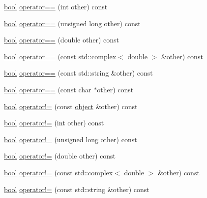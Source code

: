 \begin{DoxyCompactItemize}
\item 
\hyperlink{compiler_8h_abb452686968e48b67397da5f97445f5b}{bool} \hyperlink{classpy_1_1object_a43cecaad392dac405e8fbb5b777f9938}{operator==} (int other) const 
\item 
\hyperlink{compiler_8h_abb452686968e48b67397da5f97445f5b}{bool} \hyperlink{classpy_1_1object_aa6c7305145b8b872b36fb27cf8397a53}{operator==} (unsigned long other) const 
\item 
\hyperlink{compiler_8h_abb452686968e48b67397da5f97445f5b}{bool} \hyperlink{classpy_1_1object_a0722a770c6c637faceb3712f6ebbe2d5}{operator==} (double other) const 
\item 
\hyperlink{compiler_8h_abb452686968e48b67397da5f97445f5b}{bool} \hyperlink{classpy_1_1object_af08db740fdcaeb183d13c91303adff3d}{operator==} (const std\+::complex$<$ double $>$ \&other) const 
\item 
\hyperlink{compiler_8h_abb452686968e48b67397da5f97445f5b}{bool} \hyperlink{classpy_1_1object_af367909d01e241b06262c3dc494a192f}{operator==} (const std\+::string \&other) const 
\item 
\hyperlink{compiler_8h_abb452686968e48b67397da5f97445f5b}{bool} \hyperlink{classpy_1_1object_a72f844fcad6f46820f20ff14ce8ca26d}{operator==} (const char $\ast$other) const 
\item 
\hyperlink{compiler_8h_abb452686968e48b67397da5f97445f5b}{bool} \hyperlink{classpy_1_1object_a92b7e3e69238050e97fca69ef7c80425}{operator!=} (const \hyperlink{classpy_1_1object}{object} \&other) const 
\item 
\hyperlink{compiler_8h_abb452686968e48b67397da5f97445f5b}{bool} \hyperlink{classpy_1_1object_a402ac86190da45d937239044181ed126}{operator!=} (int other) const 
\item 
\hyperlink{compiler_8h_abb452686968e48b67397da5f97445f5b}{bool} \hyperlink{classpy_1_1object_a0b010b582ef6633267ba1f51cee50526}{operator!=} (unsigned long other) const 
\item 
\hyperlink{compiler_8h_abb452686968e48b67397da5f97445f5b}{bool} \hyperlink{classpy_1_1object_a58433b21c90de2164a7f654c2bf47bb8}{operator!=} (double other) const 
\item 
\hyperlink{compiler_8h_abb452686968e48b67397da5f97445f5b}{bool} \hyperlink{classpy_1_1object_a9b4bce8e7b22aa78dca2c945a77286c2}{operator!=} (const std\+::complex$<$ double $>$ \&other) const 
\item 
\hyperlink{compiler_8h_abb452686968e48b67397da5f97445f5b}{bool} \hyperlink{classpy_1_1object_ada424df2f084fa001218a469d16c8c56}{operator!=} (const std\+::string \&other) const 

\end{DoxyCompactItemize}
